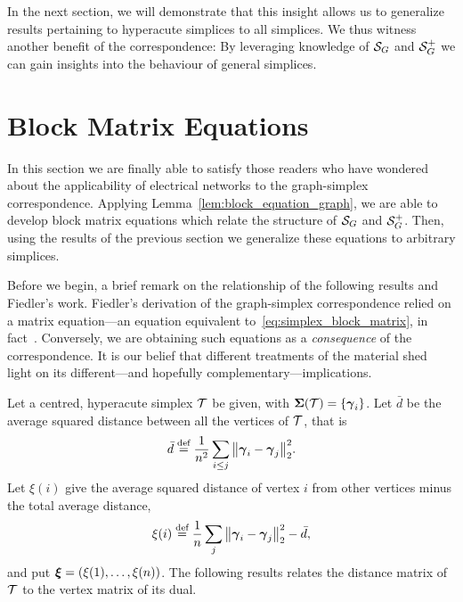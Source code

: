 In the next  section, we  will demonstrate  that this insight allows us to  generalize results pertaining to hyperacute simplices to all simplices. 
We thus witness another benefit of the correspondence: By leveraging knowledge  of $\mathcal{S}_G$ and $\mathcal{S}_G^+$ we  can  gain insights into the behaviour of general simplices. 



\section{Block Matrix Equations}
\label{sec:block_matrix}
In this section we are finally able  to satisfy those readers who have  wondered about the applicability of electrical  networks to the graph-simplex correspondence. Applying Lemma~\ref{lem:block_equation_graph}, we are able to  develop block matrix equations which relate the structure of $\mathcal{S}_G$ and $\mathcal{S}_G^+$. Then,  using the results of the previous section we generalize  these equations to arbitrary simplices.  

Before we  begin, a brief remark on the relationship of the following results  and Fiedler's work. Fiedler's derivation of the graph-simplex correspondence relied on a matrix equation---an equation equivalent to~\eqref{eq:simplex_block_matrix}, in fact~\cite[Theorem 3.1]{fiedler1993geometric}. Conversely, we are obtaining such equations as a \emph{consequence} of the correspondence. It is our belief that different treatments of the material shed light on its different---and hopefully complementary---implications.  

Let a centred, hyperacute simplex $\mathcal{T}$ be given, with $\boldsymbol{\Sigma}(\mathcal{T})=\{\vb*{\gamma}_i\}$.  Let $\bar{d}$ be the average squared distance between all the vertices of $\mathcal{T}$, that is
\begin{equation}
\label{eq:avg_squared_distance}
\bar{d} \overset{\text{def}}{=}  \frac{1}{n^2}\sum_{i\leq j} \norm{\vb*{\gamma}_i-\vb*{\gamma}_j}_2^2.
\end{equation}
Let $\xi(i)$ give the average squared distance of vertex $i$ from other vertices minus the total average distance, 
\begin{equation}
\label{eq:avg_sqd_distance_i}
\xi(i) \overset{\text{def}}{=} \frac{1}{n}\sum_{j} \norm{\vb*{\gamma}_i-\vb*{\gamma}_j}_2^2 - \bar{d},
\end{equation}
and put $\vb*{\xi}=(\xi(1),\dots,\xi(n))$. 
The following  results relates  the distance matrix of $\mathcal{T}$ to the vertex  matrix of its dual. 

